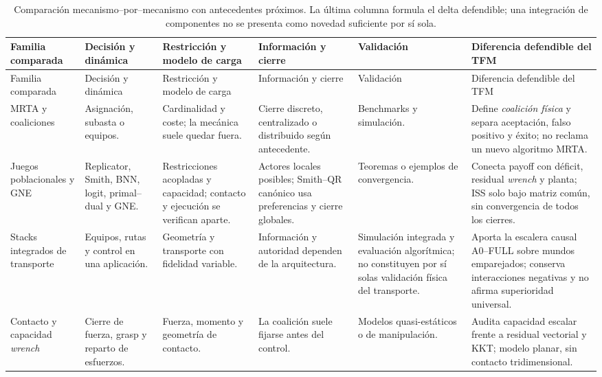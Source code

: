 \begin{landscape}
\begingroup
\scriptsize
\setlength{\tabcolsep}{2pt}
\renewcommand{\arraystretch}{1.06}
\begin{longtable}{@{}p{3.2cm}p{3.4cm}p{3.5cm}p{3.2cm}p{2.5cm}p{5.2cm}@{}}
\caption{Comparación mecanismo--por--mecanismo con antecedentes próximos. La última columna formula el delta defendible; una integración de componentes no se presenta como novedad suficiente por sí sola.}\label{tab:comparacion-mecanismos}\\
\toprule
Familia comparada & Decisión y dinámica & Restricción y modelo de carga & Información y cierre & Validación & Diferencia defendible del TFM \\
\midrule
\endfirsthead
\toprule
Familia comparada & Decisión y dinámica & Restricción y modelo de carga & Información y cierre & Validación & Diferencia defendible del TFM \\
\midrule
\endhead
\bottomrule
\endfoot
MRTA y coaliciones \citep{gerkey2004formal,korsah2013taxonomy,dutta2021hedonic,zhang2024coalition} & Asignación, subasta o equipos. & Cardinalidad y coste; la mecánica suele quedar fuera. & Cierre discreto, centralizado o distribuido según antecedente. & Benchmarks y simulación. & Define \emph{coalición física} y separa aceptación, falso positivo y éxito; no reclama un nuevo algoritmo MRTA. \\
Juegos poblacionales y GNE \citep{quijano2017population,martinez2020formation,martinezpiazuelo2022tcss,martinezpiazuelo2022automatica,martinezpiazuelo2026gne,martinezpiazuelo2026dissipativity} & Replicator, Smith, BNN, logit, primal--dual y GNE. & Restricciones acopladas y capacidad; contacto y ejecución se verifican aparte. & Actores locales posibles; Smith--QR canónico usa preferencias y cierre globales. & Teoremas o ejemplos de convergencia. & Conecta payoff con déficit, residual \emph{wrench} y planta; ISS solo bajo matriz común, sin convergencia de todos los cierres. \\
Stacks integrados de transporte \citep{paul2023collective,brown2025assembly,zhou2026cttapf} & Equipos, rutas y control en una aplicación. & Geometría y transporte con fidelidad variable. & Información y autoridad dependen de la arquitectura. & Simulación integrada y evaluación algorítmica; no constituyen por sí solas validación física del transporte. & Aporta la escalera causal A0--FULL sobre mundos emparejados; conserva interacciones negativas y no afirma superioridad universal. \\
Contacto y capacidad \emph{wrench} \citep{bicchi1995closure,ferrari1992grasps,tuci2018cooperative} & Cierre de fuerza, grasp y reparto de esfuerzos. & Fuerza, momento y geometría de contacto. & La coalición suele fijarse antes del control. & Modelos quasi-estáticos o de manipulación. & Audita capacidad escalar frente a residual vectorial y KKT; modelo planar, sin contacto tridimensional. \\

\end{longtable}
\end{landscape}
